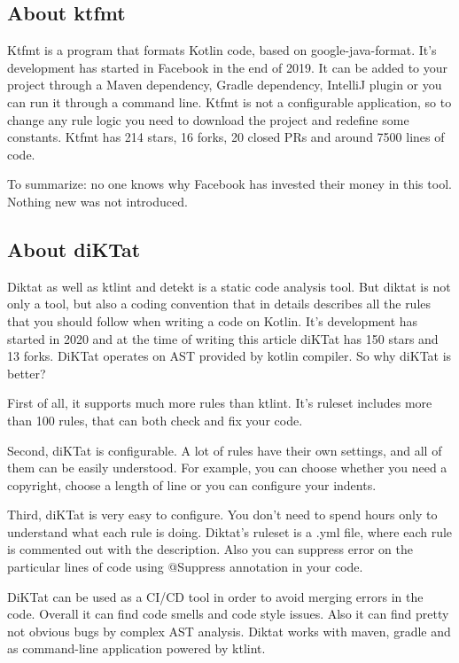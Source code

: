 \subsection{About ktfmt}
\par Ktfmt is a program that formats Kotlin code, based on google-java-format. It's development has started in Facebook in the end of 2019. It can be added to your project through a Maven dependency, Gradle dependency, IntelliJ plugin or you can run it through a command line. Ktfmt is not a configurable application, so to change any rule logic you need to download the project and redefine some constants. Ktfmt has 214 stars, 16 forks, 20 closed PRs and around 7500 lines of code. 

\par To summarize: no one knows why Facebook has invested their money in this tool. Nothing new was not introduced.

\subsection{About diKTat}
Diktat as well as ktlint and detekt is a static code analysis tool. But diktat is not only a tool, but also a coding convention that in details describes all the rules that you should follow when writing a code on Kotlin. It’s development has started in 2020 and at the time of writing this article diKTat has 150 stars and 13 forks. DiKTat operates on AST provided by kotlin compiler. So why diKTat is better?

First of all, it supports much more rules than ktlint. It’s ruleset includes more than 100 rules, that can both check and fix your code.

Second, diKTat is configurable. A lot of rules have their own settings, and all of them can be easily understood. For example, you can choose whether you need a copyright, choose a length of line or you can configure your indents.

Third, diKTat is very easy to configure. You don’t need to spend hours only to understand what each rule is doing. Diktat’s ruleset is a .yml file, where each rule is commented out with the description. Also you can suppress error on the particular lines of code using @Suppress annotation in your code.

DiKTat can be used as a CI/CD tool in order to avoid merging errors in the code. Overall it can find code smells and code style issues. Also it can find pretty not obvious bugs by complex AST analysis. Diktat works with maven, gradle and as command-line application powered by ktlint.

